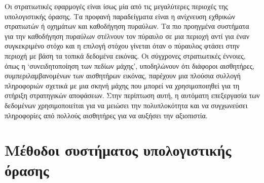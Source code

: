Οι στρατιωτικές εφαρμογές είναι ίσως μία από τις μεγαλύτερες περιοχές της υπολογιστικής όρασης. Τα προφανή παραδείγματα είναι η ανίχνευση εχθρικών στρατιωτών ή οχημάτων και καθοδήγηση πυραύλων. Τα πιο προηγμένα συστήματα για την καθοδήγηση πυραύλων στέλνουν τον πύραυλο σε μια περιοχή αντί για έναν συγκεκριμένο στόχο και η επιλογή στόχου γίνεται όταν ο πύραυλος φτάσει στην περιοχή με βάση τα τοπικά δεδομένα εικόνας. Οι σύγχρονες στρατιωτικές έννοιες, όπως η `συνειδητοποίηση των πεδίων μάχης', υποδηλώνουν ότι διάφοροι αισθητήρες, συμπεριλαμβανομένων των αισθητήρων εικόνας, παρέχουν μια πλούσια συλλογή πληροφοριών σχετικά με μια σκηνή μάχης που μπορεί να χρησιμοποιηθεί για τη στήριξη στρατηγικών αποφάσεων. Στην περίπτωση αυτή, η αυτόματη επεξεργασία των δεδομένων χρησιμοποιείται για να μειώσει την πολυπλοκότητα και να συγχωνεύσει πληροφορίες από πολλούς αισθητήρες για να αυξήσει την αξιοπιστία.
\section{Μέθοδοι συστήματος υπολογιστικής όρασης}

